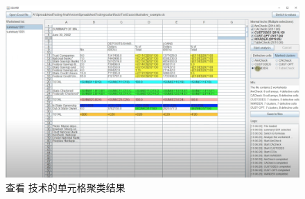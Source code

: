\begin{figure}[tp]    
    \centering
    \includegraphics[width=\textwidth]{figure/sg/sguard-6.png}
    \caption{查看 \wa 技术的单元格聚类结果}
    \label{figure-sg6}
\end{figure}
